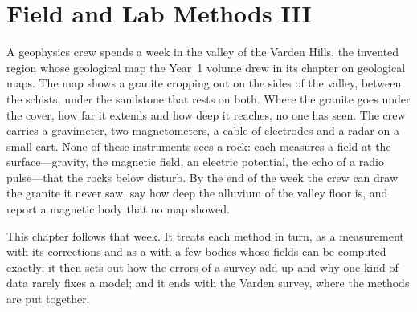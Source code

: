 \chapter{Field and Lab Methods III}\label{ch:b3:field-lab-methods-3}

A geophysics crew spends a week in the valley of the Varden Hills, the
invented region whose geological map the Year~1 volume drew in its
chapter on geological maps. The map shows a granite cropping out on
the sides of the valley, between the schists, under the sandstone that
rests on both. Where the granite goes under the cover, how far it
extends and how deep it reaches, no one has seen. The crew carries a
gravimeter, two magnetometers, a cable of electrodes and a radar on a
small cart. None of these instruments sees a rock: each measures a
field at the surface---gravity, the magnetic field, an electric
potential, the echo of a radio pulse---that the rocks below disturb.
By the end of the week the crew can draw the granite it never saw, say
how deep the alluvium of the valley floor is, and report a magnetic body
that no map showed.

This chapter follows that week. It treats each method in turn, as a
measurement with its corrections and as a  with a few
bodies whose fields can be computed exactly; it then sets out how the
errors of a survey add up and why one kind of data rarely fixes a
model; and it ends with the Varden survey, where the methods are put
together.


